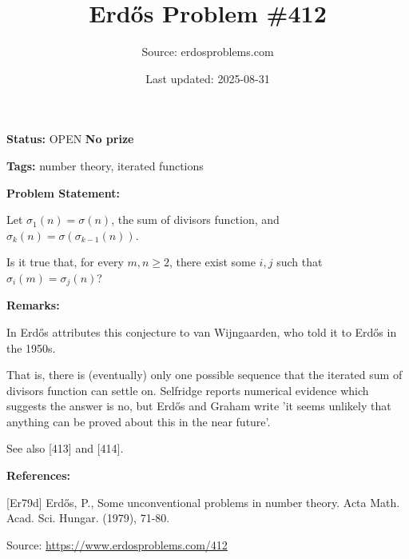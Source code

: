 \documentclass{article}
\title{Erd\H{o}s Problem \#412}
\date{Last updated: 2025-08-31}
\author{Source: erdosproblems.com}
\begin{document}
\maketitle

\noindent\textbf{Status:} OPEN \quad \textbf{No prize}

\noindent\textbf{Tags:} number theory, iterated functions

\medskip
\noindent\textbf{Problem Statement:}

Let $\sigma_1(n)=\sigma(n)$, the sum of divisors function, and $\sigma_k(n)=\sigma(\sigma_{k-1}(n))$. 

Is it true that, for every $m,n\geq 2$, there exist some $i,j$ such that $\sigma_i(m)=\sigma_j(n)$?

\bigskip
\noindent\textbf{Remarks:}

In \cite{Er79d} Erd\H{o}s attributes this conjecture to van Wijngaarden, who told it to Erd\H{o}s in the 1950s.

That is, there is (eventually) only one possible sequence that the iterated sum of divisors function can settle on. Selfridge reports numerical evidence which suggests the answer is no, but Erd\H{o}s and Graham write 'it seems unlikely that anything can be proved about this in the near future'. 

See also [413] and [414].

\bigskip
\noindent\textbf{References:}

[Er79d] Erd\H{o}s, P., Some unconventional problems in number theory. Acta Math. Acad. Sci. Hungar. (1979), 71-80.

\bigskip
\noindent\small{Source: \url{https://www.erdosproblems.com/412}}
\end{document}
